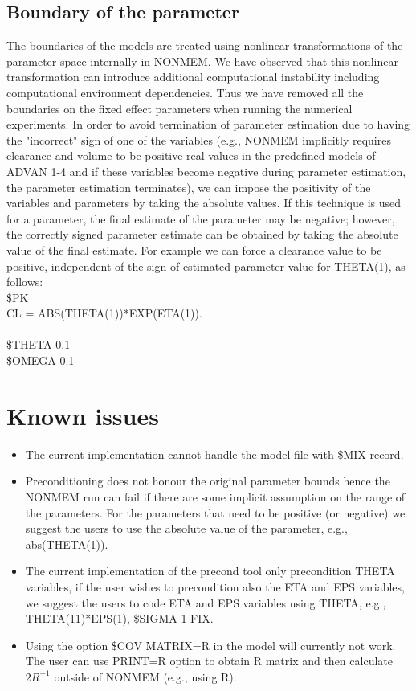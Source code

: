 \subsection{Boundary of the parameter} \label{app::abs}
The boundaries of the models are treated using nonlinear transformations of the parameter space internally in NONMEM.  We have observed that this nonlinear transformation can introduce additional computational instability including computational environment dependencies. Thus we have removed all the boundaries on the fixed effect parameters when running the numerical experiments.
In order to avoid  termination of parameter estimation due to having the "incorrect" sign of one of the variables (e.g., NONMEM implicitly requires clearance and volume to be positive real values in the predefined models of ADVAN 1-4 and if these variables become negative during parameter estimation, the parameter estimation terminates), we can impose the positivity of the variables and parameters by taking the absolute values.  If this technique is used for a parameter, the final estimate of the parameter may be negative; however, the correctly signed parameter estimate can be obtained by taking the absolute value of the final estimate.  For example we can force a clearance value to be positive, independent of the sign of estimated parameter value for THETA(1), as follows:\\
\$PK\\
CL     = ABS(THETA(1))*EXP(ETA(1)).\\
\\
\$THETA 0.1\\
\$OMEGA 0.1\\

\section{Known issues}

\begin{itemize}
    \item The current implementation cannot handle the model file with \$MIX record.

    \item Preconditioning does not honour the original parameter bounds hence the NONMEM run can fail if there are some implicit assumption on the range of the parameters.  For the parameters that need to be positive (or negative) we suggest the users to use the absolute value of the parameter, e.g., abs(THETA(1)).

    \item The current implementation of the precond tool only precondition THETA variables, if the user wishes to precondition also the ETA and EPS variables, we suggest the users to code ETA and EPS variables using THETA, e.g., THETA(11)*EPS(1), \$SIGMA 1 FIX.

    \item Using the option \$COV MATRIX=R in the model will currently not work.  The user can use PRINT=R option to obtain R matrix and then calculate $2R^{-1}$ outside of NONMEM (e.g., using R).
\end{itemize}

